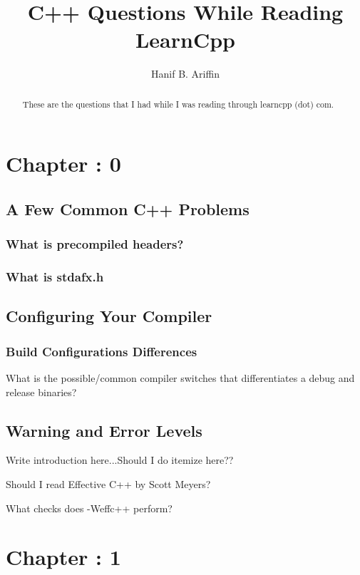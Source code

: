 \documentclass[a4paper,10pt]{article}
\title{C++ Questions While Reading LearnCpp}
\author{Hanif B. Ariffin}
\begin{document}
\maketitle
\tableofcontents

\begin{abstract}

    These are the questions that I had while I was reading through learncpp (dot) com.

\end{abstract}

\section{Chapter : 0}

\subsection{A Few Common C++ Problems}

\subsubsection{What is precompiled headers?}
\subsubsection{What is stdafx.h}

\subsection{Configuring Your Compiler}

\subsubsection{Build Configurations Differences}

What is the possible/common compiler switches that differentiates a debug and release binaries?

\subsection{Warning and Error Levels}

Write introduction here...Should I do itemize here??

Should I read Effective C++ by Scott Meyers?

What checks does -Weffc++ perform?

\section{Chapter : 1}
\end{document}
